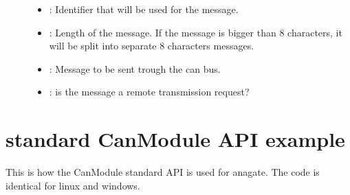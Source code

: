 \documentclass[letterpaper,10pt,english]{sphinxmanual}
\begin{document}
\begin{fulllineitems}
\begin{fulllineitems}
\begin{description}
\item[{}] \leavevmode\begin{itemize}
\item {} 
: Identifier that will be used for the message. 

\item {} 
: Length of the message. If the message is bigger than 8 characters, it will be split into separate 8 characters messages. 

\item {} 
: Message to be sent trough the can bus. 

\item {} 
: is the message a remote transmission request? 

\end{itemize}

\end{description}


\end{fulllineitems}


\end{fulllineitems}



\section{standard CanModule API example}
\label{\detokenize{vendors/anagate:standard-canmodule-api-example}}
This is how the CanModule standard API is used for anagate. The code is identical for linux and windows.

\begin{sphinxVerbatim}[commandchars=\\\{\}]
    
      
  
  
\end{sphinxVerbatim}
\end{document}
